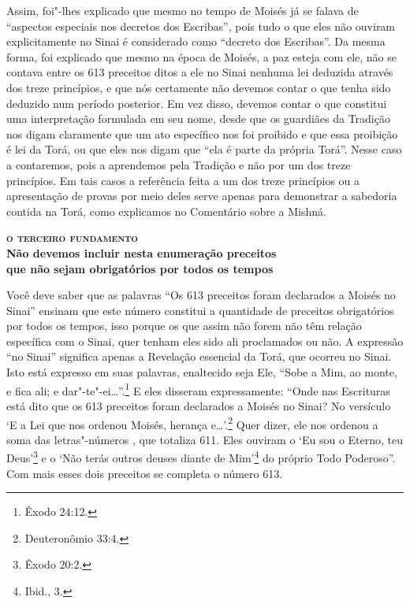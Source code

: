 Assim, foi"-lhes explicado que mesmo no tempo de Moisés já se falava de
``aspectos especiais nos decretos dos Escribas'', pois tudo o que eles
não ouviram explicitamente no Sinai é considerado como ``decreto dos
Escribas''. Da mesma forma, foi explicado que mesmo na época de Moisés,
a paz esteja com ele, não se contava entre os 613 preceitos ditos a ele
no Sinai nenhuma lei deduzida através dos treze princípios, e que nós
certamente não devemos contar o que tenha sido deduzido num período
posterior. Em vez disso, devemos contar o que constitui uma
interpretação formulada em seu nome, desde que os guardiães da Tradição
nos digam claramente que um ato específico nos foi proibido e que essa
proibição é lei da Torá\starr, ou que eles nos digam que ``ela é parte da
própria Torá\starr''. Nesse caso a contaremos, pois a aprendemos pela
Tradição e não por um dos treze princípios. Em tais casos a referência
feita a um dos treze princípios ou a apresentação de provas por meio
deles serve apenas para demonstrar a sabedoria contida na Torá\starr, como
explicamos no Comentário sobre a Mishná\starr.


\bigskip

\noindent\textbf{\textsc{o terceiro fundamento}\\Não devemos incluir nesta enumeração preceitos\\ que não sejam obrigatórios por todos os tempos}

\smallskip

Você deve saber que as palavras ``Os 613 preceitos foram declarados a
Moisés no Sinai'' ensinam que este número constitui a quantidade de
preceitos obrigatórios por todos os tempos, isso porque os que assim não
forem não têm relação específica com o Sinai, quer tenham eles sido ali
proclamados ou não. A expressão ``no Sinai'' significa apenas a
Revelação essencial da Torá\starr, que ocorreu no Sinai. Isto está expresso
em suas palavras, enaltecido seja Ele, ``Sobe a Mim, ao monte, e fica
ali; e dar"-te"-ei\ldots{}''.\footnote{Êxodo 24:12.} E eles disseram expressamente:
``Onde nas Escrituras está dito que os 613 preceitos foram declarados a
Moisés no Sinai? No versículo `E a Lei que nos ordenou Moisés, herança
e\ldots{}'.\footnote{Deuteronômio 33:4.} Quer dizer, ele nos ordenou a soma das
letras"-números , que totaliza 611. Eles ouviram o `Eu sou o
Eterno, teu Deus'\footnote{Êxodo 20:2.} e o `Não terás outros deuses diante de
Mim'\footnote{Ibid., 3.} do próprio Todo Poderoso''. Com mais esses dois
preceitos se completa o número 613.

